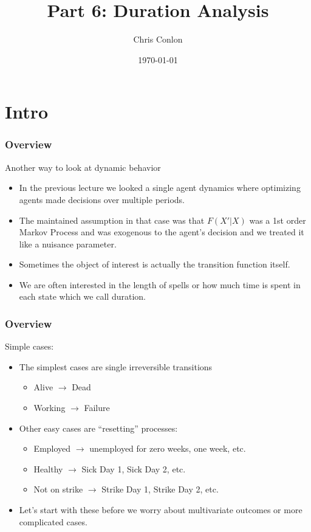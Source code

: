 \documentclass[xcolor=pdftex,dvipsnames,table,mathserif]{beamer}
\begin{document}
\title{Part 6: Duration Analysis}
\author{Chris Conlon}
\date{\today}

\frame{\titlepage}

\section{Intro}

\begin{frame}
\frametitle{Overview}
Another way to look at dynamic behavior
\begin{itemize}
\item In the previous lecture we looked a single agent dynamics where optimizing agents made decisions over multiple periods.
\item The maintained assumption in that case was that $F(X' | X)$ was a 1st order Markov Process and was exogenous to the agent's decision and we treated it like a \alert{nuisance parameter}.
\item Sometimes the object of interest is actually the \alert{transition function} itself.
\item We are often interested in the length of \alert{spells} or how much time is spent in each state which we call \alert{duration}.
\end{itemize}
\end{frame}

\begin{frame}
\frametitle{Overview}
Simple cases:
\begin{itemize}
\item The simplest cases are single irreversible transitions
\begin{itemize}
\item Alive $\rightarrow$ Dead
\item Working $\rightarrow$ Failure
\end{itemize}
\item Other easy cases are ``resetting'' processes:
\begin{itemize}
\item Employed $\rightarrow$ unemployed for zero weeks, one week, etc.
\item Healthy $\rightarrow$ Sick Day 1, Sick Day 2, etc.
\item Not on strike $\rightarrow$ Strike Day 1, Strike Day 2, etc.
\end{itemize}
\item Let's start with these before we worry about multivariate outcomes or more complicated cases.
\end{itemize}
\end{frame}
\end{document}
